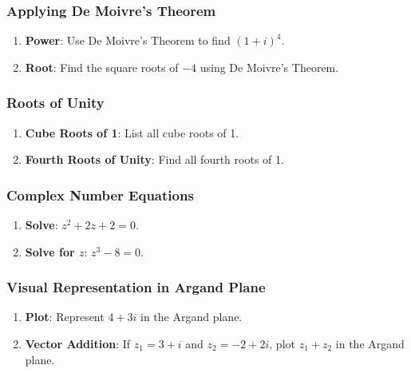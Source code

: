 \documentclass[
]{article}
\providecommand{\tightlist}{%
  \setlength{\itemsep}{0pt}\setlength{\parskip}{0pt}}
\def\tightlist{}
\begin{document}
\subsubsection{Applying De Moivre's
Theorem}\label{applying-de-moivres-theorem}

\begin{enumerate}
\def\labelenumi{\arabic{enumi}.}
\setcounter{enumi}{8}
\tightlist
\item
  \textbf{Power}: Use De Moivre's Theorem to find \((1 + i)^4\).
\item
  \textbf{Root}: Find the square roots of \(-4\) using De Moivre's
  Theorem.
\end{enumerate}

\subsubsection{Roots of Unity}\label{roots-of-unity}

\begin{enumerate}
\def\labelenumi{\arabic{enumi}.}
\setcounter{enumi}{10}
\tightlist
\item
  \textbf{Cube Roots of 1}: List all cube roots of 1.
\item
  \textbf{Fourth Roots of Unity}: Find all fourth roots of 1.
\end{enumerate}

\subsubsection{Complex Number Equations}\label{complex-number-equations}

\begin{enumerate}
\def\labelenumi{\arabic{enumi}.}
\setcounter{enumi}{12}
\tightlist
\item
  \textbf{Solve}: \(z^2 + 2z + 2 = 0\).
\item
  \textbf{Solve for \(z\)}: \(z^3 - 8 = 0\).
\end{enumerate}

\subsubsection{Visual Representation in Argand
Plane}\label{visual-representation-in-argand-plane}

\begin{enumerate}
\def\labelenumi{\arabic{enumi}.}
\setcounter{enumi}{14}
\tightlist
\item
  \textbf{Plot}: Represent \(4 + 3i\) in the Argand plane.
\item
  \textbf{Vector Addition}: If \(z_1 = 3 + i\) and \(z_2 = -2 + 2i\),
  plot \(z_1 + z_2\) in the Argand plane.
\end{enumerate}
\end{document}

